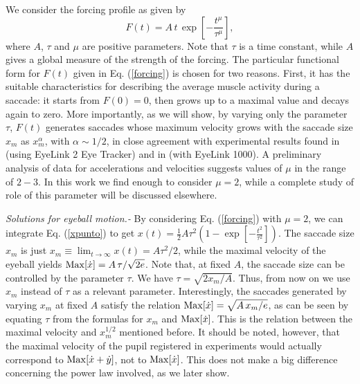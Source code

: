 \documentclass[prl]{revtex4}
\begin{document}
We consider the forcing profile as given by
\begin{equation}
F(t)=A\, t \, \exp\left[-\frac{t^\mu}{\tau^\mu}\right],      \label{forcing}
\end{equation}
where $A$, $\tau$ and $\mu$ are positive parameters. Note that $\tau$ is a time constant, while $A$ gives a global measure of the strength of the forcing. The particular functional form for $F(t)$ given in Eq. (\ref{forcing}) is chosen for two reasons. First, it has the suitable characteristics for describing the average muscle activity during a saccade: it starts from $F(0)=0$, then grows up to a maximal value and decays again to zero. More importantly, as we will show, by varying only the parameter $\tau$, $F(t)$ generates saccades whose maximum velocity grows with the saccade size $x_m$ as $x_m^\alpha$, with $\alpha\sim 1/2$, in close agreement with experimental results found in \cite{Otero:2008} (using EyeLink 2 Eye Tracker) and in \cite{gasaneo2017} (with EyeLink 1000). A preliminary analysis of data for accelerations and velocities suggests values of $\mu$ in the range of $2-3$. In this work we find enough to consider $\mu=2$, while a complete study of role of this parameter will be discussed elsewhere.

{\em Solutions for eyeball motion.-} By considering Eq. (\ref{forcing}) with $\mu=2$, we can integrate Eq. (\ref{xpunto}) to get $x(t)=\frac{1}{2} A \tau^2 \left(1-\exp[-\frac{t^2}{\tau^2}]\right)$. The saccade size $x_m$ is just $x_m\equiv\lim_{t\to\infty}x(t)=A \tau^2 /2$, while the maximal velocity of the eyeball yields ${\rm Max}[\dot{x}]=A\,\tau/\sqrt{2 e}$. Note that, at fixed $A$, the saccade size can be controlled by the parameter $\tau$. We have $\tau=\sqrt{2 x_m/ A}$. Thus, from now on we use $x_m$ instead of $\tau$ as a relevant parameter. Interestingly, the saccades generated by varying $x_m$ at fixed $A$ satisfy the relation ${\rm Max}[\dot{x}]=\sqrt{A\, x_m/e}$, as can be seen by equating $\tau$ from the formulas for $x_m$ and ${\rm Max}[\dot{x}]$. This is the relation between the maximal velocity and $x_m^{1/2}$ mentioned before. It should be noted, however, that the maximal velocity of the pupil registered in experiments would actually correspond to ${\rm Max}[\dot{x}+\dot{y}]$, not to ${\rm Max}[\dot{x}]$. This does not make a big difference concerning the power law involved, as we later show. 
\end{document}
